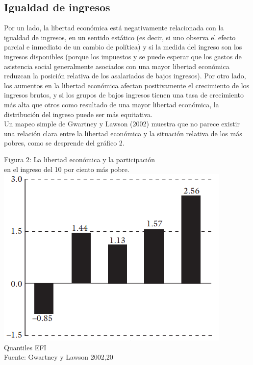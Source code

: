     \subsection*{Igualdad de ingresos}
    Por un lado, la libertad económica está negativamente relacionada con la igualdad de ingresos, en un sentido estático (es decir, si uno observa el efecto parcial e inmediato de un cambio de política) y si la medida del ingreso son los ingresos disponibles (porque los impuestos y se puede esperar que los gastos de asistencia social generalmente asociados con una mayor libertad económica reduzcan la posición relativa de los asalariados de bajos ingresos). Por otro lado, los aumentos en la libertad económica afectan positivamente el crecimiento de los ingresos brutos, y si los grupos de bajos ingresos tienen una tasa de crecimiento más alta que otros como resultado de una mayor libertad económica, la distribución del ingreso puede ser más equitativa.\\
    Un mapeo simple de Gwartney y Lawson (2002) muestra que no parece existir una relación clara entre la libertad económica y la situación relativa de los más pobres, como se desprende del gráfico 2.\\

    \begin{center}
	Figura 2: La libertad económica y la participación \\ en el ingreso del 10 por ciento más pobre.\\
	\includegraphics[scale=.5]{codigoFuente/tareas/pensamiento/img/1pensamiento.png}\\
	Quantiles EFI\\
	\small{Fuente: Gwartney y Lawson 2002,20}
    \end{center}

